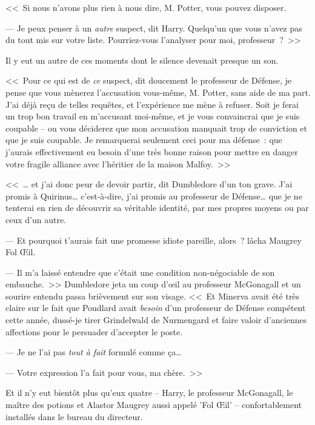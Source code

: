 <<~Si nous n'avons plus rien à nous dire, M. Potter, vous pouvez disposer.

--- Je peux penser à un \emph{autre} suspect, dit Harry. Quelqu'un que vous n'avez pas du tout mis sur votre liste. Pourriez-vous l'analyser pour moi, professeur~?~>>

Il y eut un autre de ces moments dont le silence devenait presque un son.

<<~Pour ce qui est de \emph{ce} suspect, dit doucement le professeur de Défense, je pense que vous mènerez l'accusation vous-même, M. Potter, sans aide de ma part. J'ai déjà reçu de telles requêtes, et l'expérience me mène à refuser. Soit je ferai un trop bon travail en m'accusant moi-même, et je vous convaincrai que je suis coupable -- ou vous déciderez que mon accusation manquait trop de conviction et que je suis coupable. Je remarquerai seulement ceci pour ma défense~: que j'aurais effectivement eu besoin d'une très bonne raison pour mettre en danger votre fragile alliance avec l'héritier de la maison Malfoy.~>>


<<~… et j'ai donc peur de devoir partir, dit Dumbledore d'un ton grave. J'ai promis à Quirinus… c'est-à-dire, j'ai promis au professeur de Défense… que je ne tenterai en rien de découvrir sa véritable identité, par mes propres moyens ou par ceux d'un autre.

--- Et pourquoi t'aurais fait une promesse idiote pareille, alors~? lâcha Maugrey Fol Œil.

--- Il m'a laissé entendre que c'était une condition non-négociable de son embauche.~>> Dumbledore jeta un coup d'œil au professeur McGonagall et un sourire entendu passa brièvement sur son visage. <<~Et Minerva avait été très claire sur le fait que Poudlard avait \emph{besoin} d'un professeur de Défense compétent cette année, dussé-je tirer Grindelwald de Nurmengard et faire valoir d'anciennes affections pour le persuader d'accepter le poste.

--- Je ne l'ai pas \emph{tout à fait} formulé comme ça…

--- Votre expression l'a fait pour vous, ma chère.~>>

Et il n'y eut bientôt plus qu'eux quatre -- Harry, le professeur McGonagall, le maître des potions et Alastor Maugrey aussi appelé 'Fol Œil' -- confortablement installés dans le bureau du directeur.

